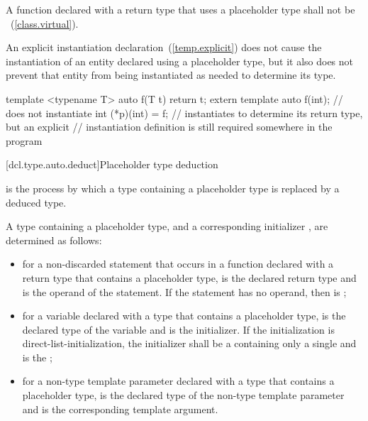 \pnum
A function declared with a return type that uses a placeholder type shall not
be ~(\ref{class.virtual}).

\pnum
An explicit instantiation declaration~(\ref{temp.explicit}) does not cause the
instantiation of an entity declared using a placeholder type, but it also does
not prevent that entity from being instantiated as needed to determine its
type.
\begin{example}
\begin{codeblock}
template <typename T> auto f(T t) { return t; }
extern template auto f(int); // does not instantiate 
int (*p)(int) = f;           // instantiates  to determine its return type, but an explicit
                             // instantiation definition is still required somewhere in the program
\end{codeblock}
\end{example}

[dcl.type.auto.deduct]{Placeholder type deduction}
%

\pnum
{}
is the process by which
a type containing a placeholder type
is replaced by a deduced type.

\pnum
A type  containing a placeholder type,
and a corresponding initializer ,
are determined as follows:

\begin{itemize}
\item
for a non-discarded  statement that occurs
in a function declared with a return type
that contains a placeholder type,
 is the declared return type
and  is the operand of the  statement.
If the  statement
has no operand,
then  is ;
\item
for a variable declared with a type
that contains a placeholder type,
 is the declared type of the variable
and  is the initializer.
If the initialization is direct-list-initialization,
the initializer shall be a 
containing only a single 
and  is the ;
\item
for a non-type template parameter declared with a type
that contains a placeholder type,
 is the declared type of the non-type template parameter
and  is the corresponding template argument.
\end{itemize}

